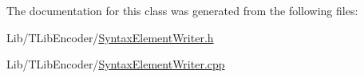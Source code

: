 The documentation for this class was generated from the following files\+:\begin{DoxyCompactItemize}
\item 
Lib/\+T\+Lib\+Encoder/\hyperlink{_syntax_element_writer_8h}{Syntax\+Element\+Writer.\+h}\item 
Lib/\+T\+Lib\+Encoder/\hyperlink{_syntax_element_writer_8cpp}{Syntax\+Element\+Writer.\+cpp}\end{DoxyCompactItemize}

